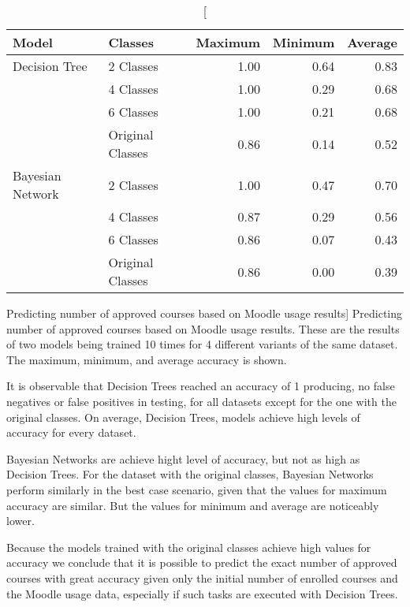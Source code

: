 \begin{table}[h!]
    \centering

    \begin{tabular}{| l | l | r | r | r |}
        \hline
        \textbf{Model} & \textbf{Classes} & \textbf{Maximum} & \textbf{Minimum} & \textbf{Average} \\ \hline
        Decision Tree    & 2 Classes        & 1.00 & 0.64 & 0.83 \\
                         & 4 Classes        & 1.00 & 0.29 & 0.68 \\
                         & 6 Classes        & 1.00 & 0.21 & 0.68 \\
                         & Original Classes & 0.86 & 0.14 & 0.52 \\ \hline
        Bayesian Network & 2 Classes        & 1.00 & 0.47 & 0.70 \\
                         & 4 Classes        & 0.87 & 0.29 & 0.56 \\
                         & 6 Classes        & 0.86 & 0.07 & 0.43 \\
                         & Original Classes & 0.86 & 0.00 & 0.39 \\ \hline
    \end{tabular}

    \caption
        [Predicting number of approved courses based on Moodle usage results]
        {Predicting number of approved courses based on Moodle usage results.
        These are the results of two models being trained 10 times for 4
        different variants of the same dataset. The maximum, minimum, and
        average accuracy is shown.}

    \label{tab:exp_003_res}
\end{table}

It is observable that Decision Trees reached an accuracy of 1 producing, no
false negatives or false positives in testing, for all datasets except for the
one with the original classes. On average, Decision Trees, models achieve high
levels of accuracy for every dataset.

Bayesian Networks are achieve hight level of accuracy, but not as high as
Decision Trees. For the dataset with the original classes, Bayesian Networks
perform similarly in the best case scenario, given that the values for maximum
accuracy are similar. But the values for minimum and average are noticeably
lower.

Because the models trained with the original classes achieve high values for
accuracy we conclude that it is possible to predict the exact number of
approved courses with great accuracy given only the initial number of enrolled
courses and the Moodle usage data, especially if such tasks are executed with
Decision Trees.

